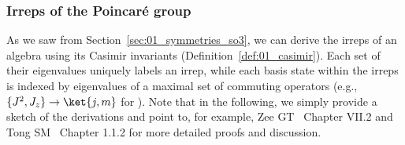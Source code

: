 \subsubsection{Irreps of the Poincaré group}

As we saw from Section~\ref{sec:01_symmetries_so3}, we can derive the irreps of an algebra using its Casimir invariants (Definition~\ref{def:01_casimir}).
Each set of their eigenvalues uniquely labels an irrep, while each basis state within the irreps is indexed by eigenvalues of a maximal set of commuting operators (e.g., $\{J^2, J_z\} \rightarrow \ket{j, m}$ for \so[3]).
Note that in the following, we simply provide a sketch of the derivations and point to, for example, Zee GT~\cite{Zee:2016fuk} Chapter VII.2 and Tong SM~\cite{TongSM} Chapter 1.1.2 for more detailed proofs and discussion.

